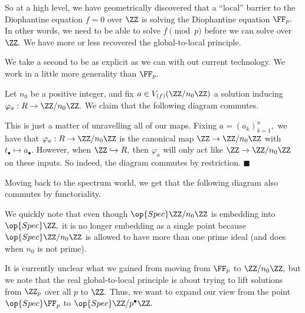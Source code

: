 So at a high level, we have geometrically discovered that a ``local'' barrier to the Diophantine equation $f=0$ over $\ZZ$ is solving the Diophantine equation $\FF_p.$ In other words, we need to be able to solve $f\pmod p$ before we can solve over $\ZZ.$ We have more or less recovered the global-to-local principle.

We take a second to be as explicit as we can with out current technology. We work in a little more generality than $\FF_p.$
\begin{lemma}
    Let $n_0$ be a positive integer, and fix $a\in V_{(f)}(\ZZ/n_0\ZZ)$ a solution inducing $\varphi_a:R\to\ZZ/n_0\ZZ.$ We claim that the following diagram commutes.
    \begin{center}
    \end{center}
\end{lemma}
This is just a matter of unravelling all of our maps. Fixing $a=(a_k)_{k=1}^n,$ we have that $\varphi_a:R\to\ZZ/n_0\ZZ$ is the canonical map $\ZZ\to\ZZ/n_0\ZZ$ with $t_\bullet\mapsto a_\bullet.$ However, when $\ZZ\hookrightarrow R,$ then $\varphi_a$ will only act like $\ZZ\to\ZZ/n_0\ZZ$ on these inputs. So indeed, the diagram commutes by restriction. $\blacksquare$

Moving back to the spectrum world, we get that the following diagram also commutes by functoriality.
\begin{center}
\end{center}
We quickly note that even though $\op{Spec}\ZZ/n_0\ZZ$ is embedding into $\op{Spec}\ZZ,$ it is no longer embedding as a single point because $\op{Spec}\ZZ/n_0\ZZ$ is allowed to have more than one prime ideal (and does when $n_0$ is not prime).

It is currently unclear what we gained from moving from $\FF_p$ to $\ZZ/n_0\ZZ,$ but we note that the real global-to-local principle is about trying to lift solutions from $\ZZ_p$ over all $p$ to $\ZZ.$ Thus, we want to expand our view from the point $\op{Spec}\FF_p$ to $\op{Spec}\ZZ/p^\bullet\ZZ.$

